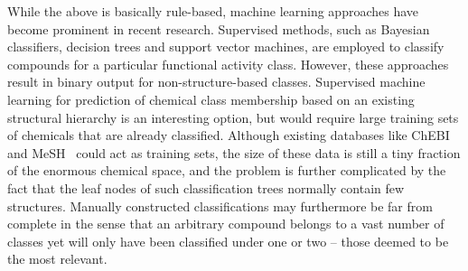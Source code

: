 \documentclass[10pt]{bmc_article}
\newenvironment{bmcformat}{\baselineskip20pt\sloppy\setboolean{publ}{false}}{\baselineskip20pt\sloppy}
\begin{document}
\begin{bmcformat}
While the above is basically rule-based, machine learning approaches have become prominent in recent research. Supervised methods, such as Bayesian classifiers, decision trees and support vector machines, are employed to classify compounds for a particular functional activity class.  However, these approaches result in binary output for non-structure-based classes. Supervised machine learning for prediction of chemical class membership based on an existing structural hierarchy is an interesting option, but would require large training sets of chemicals that are already classified. Although existing databases like ChEBI and MeSH~\cite{meshUrl} could act as training sets, the size of these data is still a tiny fraction of the enormous chemical space, and the problem is further complicated by the fact that the leaf nodes of such classification trees normally contain few structures. Manually constructed classifications may furthermore be far from complete in the sense that an arbitrary compound belongs to a vast number of classes yet will only have been classified under one or two -- those deemed to be the most relevant. 


\end{bmcformat}
\end{document}
